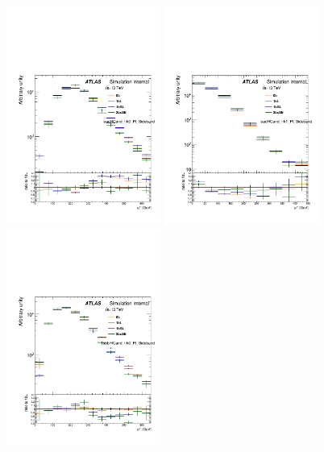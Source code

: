 \begin{figure}[htbp!]
\begin{center}
\includegraphics[width=0.45\textwidth,angle=-90]{figures/boosted/AppendixDijetMC/leadHCand_trk0_Pt_SidebandwoPr_log.pdf}
\includegraphics[width=0.45\textwidth,angle=-90]{figures/boosted/AppendixDijetMC/leadHCand_trk1_Pt_SidebandwoPr_log.pdf}
\includegraphics[width=0.45\textwidth,angle=-90]{figures/boosted/AppendixDijetMC/sublHCand_trk0_Pt_SidebandwoPr_log.pdf}

\end{center}
\end{figure}
